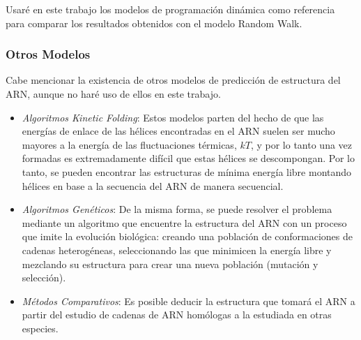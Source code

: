 \documentclass[a4paper,11pt,titlepage]{article}
\theoremstyle{definition}
\begin{document}


Usaré en este trabajo los modelos de programación dinámica como referencia para comparar los resultados obtenidos con el modelo Random Walk.

\subsubsection{Otros Modelos}\label{subsubsec:others}

Cabe mencionar la existencia de otros modelos de predicción de estructura del ARN, aunque no haré uso de ellos en este trabajo.

\begin{itemize}
    \item \textit{Algoritmos Kinetic Folding}: Estos modelos parten del hecho de que las energías de enlace de las hélices encontradas en el ARN suelen ser mucho mayores a la energía de las fluctuaciones térmicas, $kT$, y por lo tanto una vez formadas es extremadamente difícil que estas hélices se descompongan. Por lo tanto, se pueden encontrar las estructuras de mínima energía libre montando hélices en base a la secuencia del ARN de manera secuencial.
    \item \textit{Algoritmos Genéticos}: De la misma forma, se puede resolver el problema mediante un algoritmo que encuentre la estructura del ARN con un proceso que imite la evolución biológica: creando una población de conformaciones de cadenas heterogéneas, seleccionando las que minimicen la energía libre y mezclando su estructura para crear una nueva población (mutación y selección).
    \item \textit{Métodos Comparativos}: Es posible deducir la estructura que tomará el ARN a partir del estudio de cadenas de ARN homólogas a la estudiada en otras especies.
\end{itemize}
\end{document}
